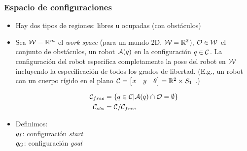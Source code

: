 \begin{frame}
    \frametitle{Espacio de configuraciones}
    
    \begin{itemize}
        \item Hay dos tipos de regiones: libres u ocupadas (con obstáculos)
        \item Sea $\mathcal{W} = \mathbb{R}^{m}$ el \emph{work space} (para un mundo 2D, $\mathcal{W} = \mathbb{R}^{2}$), $\mathcal{O} \in \mathcal{W}$ el conjunto de obstáculos, un robot $\mathcal{A}(q)$ en la configuración $q \in \mathcal{C}$.
        La configuración del robot especifica completamente la pose del robot en $\mathcal{W}$ incluyendo la especificación de todos los grados de libertad. (E.g., un robot con un cuerpo rígido en el plano $\mathcal{C} = \begin{bmatrix}
            x & y & \theta
        \end{bmatrix} = \mathbb{R}^{2} \times S_{1}$ .)
        
        \begin{align*}
            \mathcal{C}_{free} &= \left\lbrace q \in \mathcal{C} | \mathcal{A}(q) \cap \mathcal{O} =  \emptyset \right\rbrace\\
            \mathcal{C}_{obs} &= \mathcal{C} / \mathcal{C}_{free}
        \end{align*}
        
        \item Definimos:\\
        $q_{I}$: configuración \emph{start}\\
        $q_{G}$: configuración \emph{goal}
        
        
       

\end{itemize}
\end{frame}
